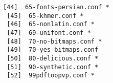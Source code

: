\documentclass[11pt,a4paper]{article}
\begin{document}
\begin{itemize}
\begin{lstlisting}[style=BashInputRoot]
 [44]  65-fonts-persian.conf *                                                                    
 [45]  65-khmer.conf *                                                                            
 [46]  65-nonlatin.conf *                                                                         
 [47]  69-unifont.conf *                                                                          
 [48]  70-no-bitmaps.conf *                                                                       
 [49]  70-yes-bitmaps.conf                                                                        
 [50]  80-delicious.conf *                                                                        
 [51]  90-synthetic.conf *
 [52]  99pdftoopvp.conf *
                \end{lstlisting}
            \end{itemize}
\end{document}
